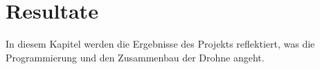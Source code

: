 \chapter{Resultate} \label{ch:Resultate}

In diesem Kapitel werden die Ergebnisse des Projekts reflektiert, was die Programmierung und den Zusammenbau der Drohne angeht.  
\begin{comment}
\section{Datenanalyse und -verarbeitung}
Die Datenerfassung bildete einen zentralen Bestandteil des Projekts, um die genaue Fluglage der Drohne während der verschiedenen Testversuche zu analysieren.
\subsection{Datenerfassung}  
 Hierzu wurden kontinuierlich Beschleunigungsdaten vom Accelerometer aufgezeichnet und in Echtzeit in Winkel umgerechnet. Die von der Software Betaflight Configurator bereitgestellten Daten dienten dabei nicht nur der Visualisierung der Neigung der Drohne in Form einer 3D-Grafik, sondern auch als Grundlage für weitere Berechnungen. Neben den berechneten Winkelwerten konnten auch die Rohdaten des Accelerometers extrahiert werden, was eine detaillierte Untersuchung der Neigungswinkel entlang der Längs- und Querachse ermöglichte. Um die Präzision der Messungen sicherzustellen, wurden die Sensoren vor Beginn der Tests sorgfältig kalibriert. Besonderes Augenmerk wurde auf die Wiederholbarkeit und Reproduzierbarkeit der Messungen gelegt, wodurch die allgemeine Gültigkeit der Ergebnisse gewährleistet wurde. Zusätzlich wurden alle Werte, soweit sinnvoll, auf zwei Dezimalstellen gerundet, um eine ausreichende Genauigkeit sicherzustellen.

\subsection{Datenanalyse}  
Die gesammelten Daten wurden sorgfältig analysiert, um mögliche Muster oder Auffälligkeiten zu identifizieren. Dabei lag der Fokus auf der Interpretation der Accelerometer-Rohdaten sowie der daraus berechneten Winkelwerte. Verschiedene statistische Methoden und visuelle Analysen wurden verwendet, um Trends und Korrelationen zu untersuchen. Durch diese systematische Auswertung konnten präzise Rückschlüsse auf die Leistung und Stabilität der Drohne gezogen werden. Die Analyse lieferte wertvolle Einblicke in die Funktionsweise der Sensoren und ihrer Kalibrierung, was entscheidend für die Arbeit war.


\end{comment}
